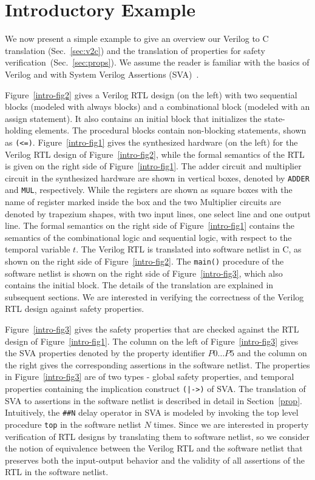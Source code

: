 
\section{Introductory Example} 

We now present a simple example to give an overview our Verilog to C translation (Sec.~\ref{sec:v2c}) and the translation of properties for safety verification~(Sec.~\ref{sec:props}). We assume the reader is familiar with the basics of Verilog and with System Verilog Assertions (SVA)~\cite{verilog}.

Figure~\ref{intro-fig2} gives a Verilog RTL design (on the left) with 
two sequential blocks (modeled with always blocks) and a combinational block 
(modeled with an assign statement). It also contains an initial block that 
initializes the state-holding elements. The procedural blocks contain 
non-blocking statements, shown as \texttt{(<=)}.  Figure~\ref{intro-fig1} 
gives the synthesized hardware (on the left) for the Verilog RTL design 
of Figure~\ref{intro-fig2}, while the formal semantics of the RTL is given 
on the right side of Figure~\ref{intro-fig1}.  The adder circuit and 
multiplier circuit in the synthesized hardware are shown in vertical boxes, 
denoted by \texttt{ADDER} and \texttt{MUL}, respectively.  While the 
registers are shown as square boxes with the name of register marked 
inside the box and the two Multiplier circuits are denoted by trapezium 
shapes, with two input lines, one select line and one output line.  
The formal semantics on the right side of Figure~\ref{intro-fig1} 
contains the semantics of the combinational logic and sequential logic, 
with respect to the temporal variable $t$. 
%
The Verilog RTL is translated into software netlist in C, as shown on the 
right side of Figure~\ref{intro-fig2}.  The \texttt{main()} procedure of 
the software netlist is shown on the right side of Figure~\ref{intro-fig3}, 
which also contains the initial block.
%  
The details of the translation are explained in subsequent sections.  
We are interested in verifying the correctness of the Verilog RTL design 
against safety properties. 
%

Figure~\ref{intro-fig3} gives the safety properties that are checked 
against the RTL design of Figure~\ref{intro-fig1}.  The column on the 
left of Figure~\ref{intro-fig3} 
gives the SVA properties denoted by the property identifier 
$P0 \ldots P5$ and the column on the right gives the 
corresponding assertions in the software netlist.  The properties 
in Figure~\ref{intro-fig3} are of two types - global safety properties, 
and temporal properties containing the implication construct \texttt{(|->)} of SVA.  
The translation of SVA to assertions in the software netlist is described 
in detail in Section~\ref{prop}. 
%  
Intuitively, the \texttt{\#\#N} delay operator in SVA is modeled by invoking 
the top level procedure \texttt{top} in the software netlist $N$ times.  
Since we are interested in property verification of RTL designs by translating 
them to software netlist, so we consider the notion of equivalence between 
the Verilog RTL and the software netlist that preserves both the 
input-output behavior and the validity of all assertions of the RTL in the 
software netlist. 

